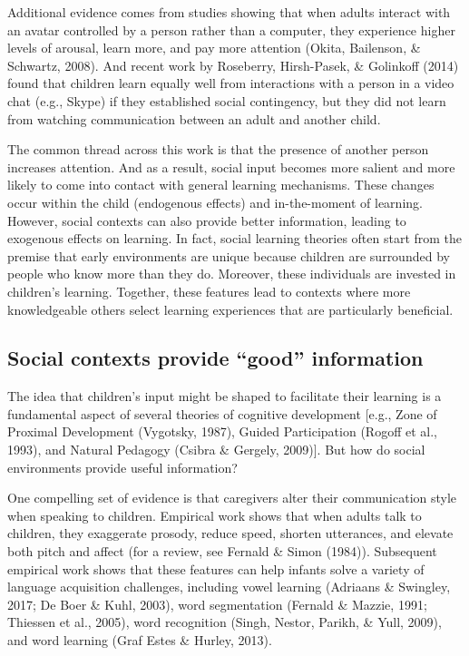 \documentclass[oneside]{report}
\begin{document}
Additional evidence comes from studies showing that when adults interact
with an avatar controlled by a person rather than a computer, they
experience higher levels of arousal, learn more, and pay more attention
(Okita, Bailenson, \& Schwartz, 2008). And recent work by Roseberry,
Hirsh-Pasek, \& Golinkoff (2014) found that children learn equally well
from interactions with a person in a video chat (e.g., Skype) if they
established social contingency, but they did not learn from watching
communication between an adult and another child.

The common thread across this work is that the presence of another
person increases attention. And as a result, social input becomes more
salient and more likely to come into contact with general learning
mechanisms. These changes occur within the child (endogenous effects)
and in-the-moment of learning. However, social contexts can also provide
better information, leading to exogenous effects on learning. In fact,
social learning theories often start from the premise that early
environments are unique because children are surrounded by people who
know more than they do. Moreover, these individuals are invested in
children's learning. Together, these features lead to contexts where
more knowledgeable others select learning experiences that are
particularly beneficial.

\hypertarget{social-contexts-provide-good-information}{%
\subsection{Social contexts provide ``good''
information}\label{social-contexts-provide-good-information}}

The idea that children's input might be shaped to facilitate their
learning is a fundamental aspect of several theories of cognitive
development {[}e.g., Zone of Proximal Development (Vygotsky, 1987),
Guided Participation (Rogoff et al., 1993), and Natural Pedagogy (Csibra
\& Gergely, 2009){]}. But how do social environments provide useful
information?

One compelling set of evidence is that caregivers alter their
communication style when speaking to children. Empirical work shows that
when adults talk to children, they exaggerate prosody, reduce speed,
shorten utterances, and elevate both pitch and affect (for a review, see
Fernald \& Simon (1984)). Subsequent empirical work shows that these
features can help infants solve a variety of language acquisition
challenges, including vowel learning (Adriaans \& Swingley, 2017; De
Boer \& Kuhl, 2003), word segmentation (Fernald \& Mazzie, 1991;
Thiessen et al., 2005), word recognition (Singh, Nestor, Parikh, \&
Yull, 2009), and word learning (Graf Estes \& Hurley, 2013).
\end{document}
